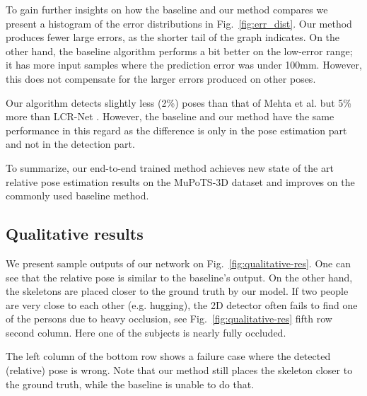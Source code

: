 \documentclass[conference]{IEEEtran}
\begin{document}
\begin{figure*}
\begin{tabular}{ccccccc}
\end{tabular}
\caption{Qualitative results. Dark skeletons are ground truth values, light ones are the network predictions. Bottom left: an erroneous result, bottom right: a case when the hip is hidden. For more information, see text. Note: viewing angles differ from those of the images for visualization purposes. Also, not all people visible in the scene have ground-truth annotations, those are not displayed in the figure.}
\label{fig:qualitative-res}
\end{figure*}

To gain further insights on how the baseline and our method compares we present a histogram of the error distributions in Fig.~\ref{fig:err_dist}. Our method produces fewer large errors, as the shorter tail of the graph indicates. On the other hand, the baseline algorithm performs a bit better on the low-error range; it has more input samples where the prediction error was under 100mm. However, this does not compensate for the larger errors produced on other poses.

Our algorithm detects slightly less (2\%) poses than that of Mehta et al. \cite{mehta2018single_shot} but 5\% more than LCR-Net \cite{rogez2017lcrnet}. However, the baseline and our method have the same performance in this regard as the difference is only in the pose estimation part and not in the detection part.

To summarize, our end-to-end trained method achieves new state of the art relative pose estimation results on the MuPoTS-3D dataset and improves on the commonly used baseline method.

\subsection{Qualitative results}
We present sample outputs of our network on Fig.~\ref{fig:qualitative-res}. One can see that the relative pose is similar to the baseline's output. On the other hand, the skeletons are placed closer to the ground truth by our model. If two people are very close to each other (e.g. hugging), the 2D detector often fails to find one of the persons due to heavy occlusion, see Fig.~\ref{fig:qualitative-res} fifth row second column. Here one of the subjects is nearly fully occluded.

The left column of the bottom row shows a failure case where the detected (relative) pose is wrong. Note that our method still places the skeleton closer to the ground truth, while the baseline is unable to do that.
\end{document}
